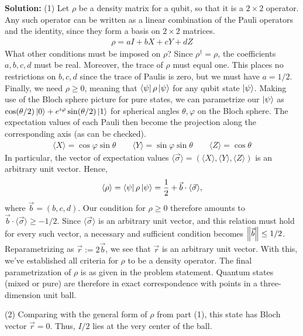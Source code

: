 \documentclass{book}
\begin{document}
    \textbf{Solution:} (1) Let $\rho$ be a density matrix for a qubit, so that it is a $2\times 2$ operator. Any such operator can be written as a linear combination of the Pauli operators and the identity, since they form a basis on $2\times 2$ matrices.
    \begin{align}
        \rho = a I + b X + c Y + d Z
    \end{align}
    What other conditions must be imposed on $\rho$? Since $\rho^\dagger = \rho$, the coefficients $a, b, c, d$ must be real. Moreover, the trace of $\rho$ must equal one. This places no restrictions on $b, c, d$ since the trace of Paulis is zero, but we must have $a = 1/2$. Finally, we need $\rho \geq 0$, meaning that $\bra{\psi}\rho \ket{\psi}$ for any qubit state $\ket{\psi}$. Making use of the Bloch sphere picture for pure states, we can parametrize our $\ket{\psi}$ as $\cos(\theta/2) \ket{0} + e^{i\varphi}\sin(\theta/2) \ket{1}$ for spherical angles $\theta, \varphi$ on the Bloch sphere. The expectation values of each Pauli then become the projection along the corresponding axis (as can be checked).
    \begin{align}
        \langle X\rangle = \cos\varphi \sin\theta \qquad \langle Y \rangle = \sin\varphi \sin\theta \qquad \langle Z \rangle = \cos\theta
    \end{align}
    In particular, the vector of expectation values $\langle \vec{\sigma}\rangle = (\langle X \rangle, \langle Y \rangle, \langle Z \rangle)$ is an arbitrary unit vector. Hence,
    \begin{align}
        \langle \rho \rangle = \bra{\psi} \rho \ket{\psi} = \frac{1}{2} + \vec{b} \cdot \langle \vec{\sigma} \rangle,
    \end{align}
    where $\vec{b} = (b,c,d)$.
    Our condition for $\rho \geq 0$ therefore amounts to $\vec{b} \cdot \langle \vec{\sigma} \rangle \geq -1/2$. Since $\langle \vec{\sigma} \rangle$ is an arbitrary unit vector, and this relation must hold for every such vector, a necessary and sufficient condition becomes $\norm{\vec{b}} \leq 1/2$. Reparametrizing as $\vec{r} := 2 \vec{b}$, we see that $\vec{r}$ is an arbitrary unit vector. With this, we've established all criteria for $\rho$ to be a density operator. The final parametrization of $\rho$ is as given in the problem statement. Quantum states (mixed or pure) are therefore in exact correspondence with points in a three-dimension unit ball. 

    (2) Comparing with the general form of $\rho$ from part (1), this state has Bloch vector $\vec{r} = 0$. Thus, $I/2$ lies at the very center of the ball.
\end{document}
